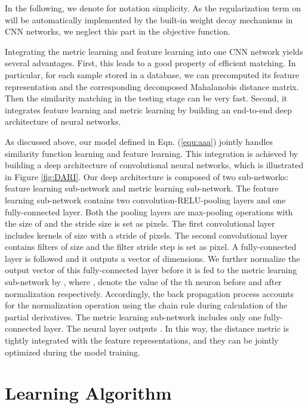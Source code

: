 \documentclass[letterpaper]{article}
\begin{document}
In the following, we denote  for notation simplicity. As the regularization term on  will be automatically implemented by the built-in weight decay  mechanisms in CNN networks, we neglect this part in the objective function.

\begin{small}

\end{small}

Integrating the metric learning and feature learning into one CNN network yields several advantages. First, this leads to a good property of efficient matching. In particular, for each sample stored in a database, we can precomputed its feature representation and the corresponding decomposed Mahalanobis distance matrix. Then the similarity matching in the testing stage can be very fast. Second, it integrates feature learning and metric learning by building an end-to-end deep architecture of neural networks.


As discussed above, our model defined in Eqn. (\ref{equ:aaa}) jointly handles similarity function learning and feature learning. This integration is achieved by building a deep architecture of convolutional neural networks, which is illustrated in Figure \ref{fig:DARI}. Our deep architecture is composed of two sub-networks: feature learning sub-network and metric learning sub-network. The feature learning sub-network contains two convolution-RELU-pooling layers and one fully-connected layer. Both the pooling layers are max-pooling operations with the size of  and the stride size is set as  pixels. The first convolutional layer includes  kernels of size  with a stride of  pixels. The second convolutional layer contains  filters of size  and the filter stride step is set as  pixel. A fully-connected layer is followed and it outputs a vector of  dimensions. We further normalize the output vector of this fully-connected layer before it is fed to the metric learning sub-network by , where ,  denote the value of the th neuron before and after normalization respectively. Accordingly, the back propagation process accounts for the normalization operation using the chain rule during calculation of the partial derivatives. The metric learning sub-network includes only one fully-connected layer. The neural layer outputs . In this way, the distance metric is tightly integrated with the feature representations, and they can be jointly optimized during the model training.



\section {Learning Algorithm}
\end{document}
